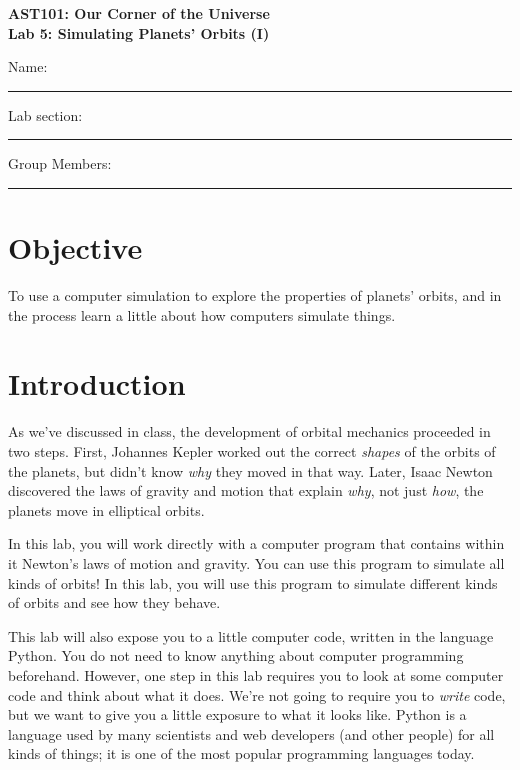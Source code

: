\documentclass[11pt]{article}
\begin{document}
\begin{center}
\textbf{\Large
AST101: Our Corner of the Universe \\
\vspace*{0.1cm}
Lab 5: Simulating Planets' Orbits (I)
}
\end{center}

\vspace*{0.5cm}

{\Large Name:}\vspace*{0.5cm}\\\hrule
{\Large Lab section:}\vspace*{0.5cm}\\\hrule
{\Large Group Members:}\vspace*{0.5cm}\\\hrule
\vspace*{0.5cm}


\section{Objective}

To use a computer simulation to explore the properties of planets' orbits, and in the process learn a little about how computers simulate things.

\section{Introduction}

As we've discussed in class, the development of orbital mechanics proceeded in two steps. First, Johannes Kepler worked out the correct {\it shapes} of the orbits of the planets, but didn't know {\it why} they moved in that way. Later, Isaac Newton discovered the laws of gravity and motion that explain {\it why}, not just {\it how}, the planets move in elliptical orbits.

In this lab, you will work directly with a computer program that contains within it Newton's laws of motion and gravity. You can use this program to simulate all kinds of orbits! In this lab, you will use this program to simulate different kinds of orbits and see how they behave.

This lab will also expose you to a little computer code, written in the language Python. You do not need to know anything about computer programming beforehand. However, one step in this lab requires you to look at some computer code and think about what it does. We're not going to require you to {\it write} code, but we want to give you a little exposure to what it looks like. Python is a language used by many scientists and web developers (and other people) for all kinds of things; it is one of the most popular programming languages today.
\end{document}
